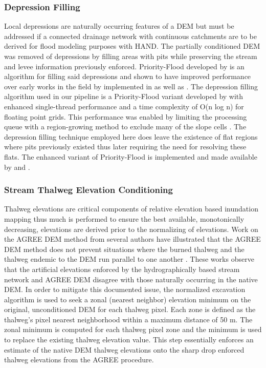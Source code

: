 \documentclass[draft]{dependencies/agujournal2019}
\begin{document}
\subsubsection{Depression Filling}
\label{sssec:depression_filling}
%
Local depressions are naturally occurring features of a DEM but must be addressed if a connected drainage network with continuous catchments are to be derived for flood modeling purposes with HAND.
The partially conditioned DEM was removed of depressions by filling areas with pits while preserving the stream and levee information previously enforced.
Priority-Flood developed by  is an algorithm for filling said depressions and shown to have improved performance over early works in the field by  implemented in  as well as .
The depression filling algorithm used in our pipeline is a Priority-Flood variant developed by \cite{zhou2016efficient} with enhanced single-thread performance and a time complexity of O(n log n) for floating point grids.
This performance was enabled by limiting the processing queue with a region-growing method to exclude many of the slope cells \cite{zhou2016efficient}.
The depression filling technique employed here does leave the existence of flat regions where pits previously existed thus later requiring the need for resolving these flats.
The enhanced variant of Priority-Flood is implemented and made available by  and .
%
\subsubsection{Stream Thalweg Elevation Conditioning}
\label{sssec:stream_thalweg_elevation_conditioning}
%
Thalweg elevations are critical components of relative elevation based inundation mapping thus much is performed to ensure the best available, monotonically decreasing, elevations are derived prior to the normalizing of elevations.
Work on the AGREE DEM method from several authors have illustrated that the AGREE DEM method does not prevent situations where the burned thalweg and the thalweg endemic to the DEM run parallel to one another \cite{hellweger1997agree,baker2006comparison,saunders1999preparation,saunders1996gis,quenzer1998gis,saunders1995grid}.
These works observe that the artificial elevations enforced by the hydrographically based stream network and AGREE DEM disagree with those naturally occurring in the native DEM.
In order to mitigate this documented issue, the normalized excavation algorithm \cite{saunders1999preparation} is used to seek a zonal (nearest neighbor) elevation minimum on the original, unconditioned DEM for each thalweg pixel. 
Each zone is defined as the thalweg's pixel nearest neighborhood within a maximum distance of 50 m.
The zonal minimum is computed for each thalweg pixel zone and the minimum is used to replace the existing thalweg elevation value.
This step essentially enforces an estimate of the native DEM thalweg elevations onto the sharp drop enforced thalweg elevations from the AGREE procedure.
\end{document}
